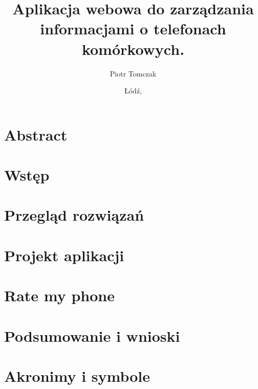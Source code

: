 \documentclass[a4paper,12pt,twoside]{extreport}
\title{Aplikacja webowa do zarządzania informacjami o telefonach komórkowych.}
\author{Piotr Tomczak}
\date{\L{}\'od\'z, \mydate}
\begin{document}


\thispagestyle{plain}

\chapter*{Abstract}


% 

\tableofcontents
{}

\chapter{Wstęp}


\chapter{Przegląd rozwiązań}


\chapter{Projekt aplikacji}


\chapter{Rate my phone}


\chapter{Podsumowanie i wnioski}


\printbibliography[heading=bibintoc, title=Bibliografia]

\newpage
\listoffigures

\newpage
\listofcodes

\newpage
\listoftables

\appendix
\chapter{Akronimy i symbole}

\end{document}
